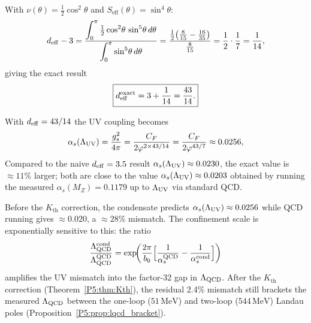 \begin{proposition}
\label{P5:prop:deff_exact}
With $\nu(\theta) = \tfrac{1}{2}\cos^2\!\theta$ and
$S_{\mathrm{eff}}(\theta) = \sin^4\!\theta$:
\begin{equation}
  d_{\mathrm{eff}} - 3
  = \frac{\displaystyle\int_0^\pi
    \tfrac{1}{2}\cos^2\!\theta\,\sin^5\!\theta\,d\theta}
         {\displaystyle\int_0^\pi \sin^5\!\theta\,d\theta}
  = \frac{\tfrac{1}{2}\bigl(\tfrac{8}{15}-\tfrac{16}{35}\bigr)}{\tfrac{8}{15}}
  = \frac{1}{2}\cdot\frac{1}{7}
  = \frac{1}{14},
  \label{P5:eq:deff_minus3}
\end{equation}
giving the exact result
\begin{equation}
  \boxed{d_{\mathrm{eff}}^{\mathrm{exact}} = 3 + \frac{1}{14} = \frac{43}{14}.}
  \label{P5:eq:deff_exact_result}
\end{equation}
\end{proposition}

\noindent With $d_{\mathrm{eff}}=43/14$ the UV coupling becomes
\begin{equation}
  \alpha_s(\Lambda_{\mathrm{UV}})
  = \frac{g_s^2}{4\pi}
  = \frac{C_F}{2\varphi^{2\times43/14}}
  = \frac{C_F}{2\varphi^{43/7}}
  \approx 0.0256,
  \label{P5:eq:as_UV_exact}
\end{equation}
Compared to the naive $d_{\mathrm{eff}}=3.5$ result $\alpha_s(\Lambda_{\mathrm{UV}})\approx0.0230$,
the exact value is $\approx11\%$ larger; both are close to the value
$\alpha_s(\Lambda_{\mathrm{UV}})\approx0.0203$ obtained by running the measured
$\alpha_s(M_Z)=0.1179$ up to $\Lambda_{\mathrm{UV}}$ via standard QCD.

\begin{remark}
\label{P5:rem:exp_sensitivity}
Before the $K_{\mathrm{th}}$ correction, the condensate predicts
$\alpha_s(\Lambda_{\mathrm{UV}})\approx0.0256$ while QCD running gives $\approx0.020$,
a $\approx28\%$ mismatch. The confinement scale is exponentially
sensitive to this: the ratio
\begin{equation}
  \frac{\Lambda_{\mathrm{QCD}}^{\mathrm{cond}}}{\Lambda_{\mathrm{QCD}}^{\mathrm{QCD}}}
  = \exp\!\biggl(\frac{2\pi}{b_0}
    \Bigl[\frac{1}{\alpha_s^{\mathrm{QCD}}}-\frac{1}{\alpha_s^{\mathrm{cond}}}\Bigr]
    \biggr)
  \label{P5:eq:LQCD_amplification}
\end{equation}
amplifies the UV mismatch into the factor-32 gap in $\Lambda_{\mathrm{QCD}}$.
After the $K_{\mathrm{th}}$ correction (Theorem~\ref{P5:thm:Kth}), the
residual 2.4\% mismatch still brackets the measured $\Lambda_{\mathrm{QCD}}$ between
the one-loop ($51\,\mathrm{MeV}$) and two-loop ($544\,\mathrm{MeV}$)
Landau poles (Proposition~\ref{P5:prop:lqcd_bracket}).
\end{remark}

